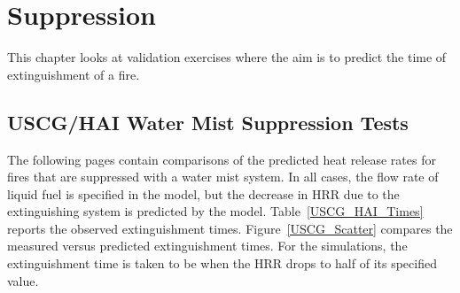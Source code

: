 
\chapter{Suppression}

This chapter looks at validation exercises where the aim is to predict the time of extinguishment of a fire.


\section{USCG/HAI Water Mist Suppression Tests}

The following pages contain comparisons of the predicted heat release rates for fires that are suppressed with a water mist system. In all cases, the flow rate of liquid
fuel is specified in the model, but the decrease in HRR due to the extinguishing system is predicted by the model. Table~\ref{USCG_HAI_Times} reports the observed extinguishment
times. Figure~\ref{USCG_Scatter} compares the measured versus predicted extinguishment times. For the simulations, the extinguishment time is taken to be when the HRR drops to 
half of its specified value.

